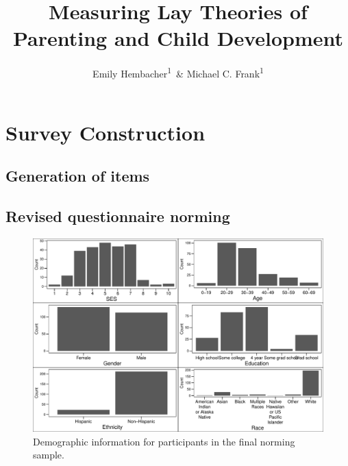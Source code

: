 \documentclass[man]{apa6}
\title{Measuring Lay Theories of Parenting and Child Development}
\author{Emily Hembacher\textsuperscript{1}~\& Michael C. Frank\textsuperscript{1}}
\affiliation{
    \vspace{0.5cm}
          \textsuperscript{1} Stanford University  }
\theoremstyle{definition}
\theoremstyle{definition}
\theoremstyle{definition}
\theoremstyle{remark}
\begin{document}
\maketitle

\setcounter{secnumdepth}{0}



\section{Survey Construction}\label{survey-construction}

\subsection{Generation of items}\label{generation-of-items}

\subsection{Revised questionnaire
norming}\label{revised-questionnaire-norming}

\begin{figure}
\centering
\includegraphics{PAQ_paper_files/figure-latex/normdemo-1.pdf}
\caption{\label{fig:normdemo}Demographic information for participants in the
final norming sample.}
\end{figure}
\end{document}
